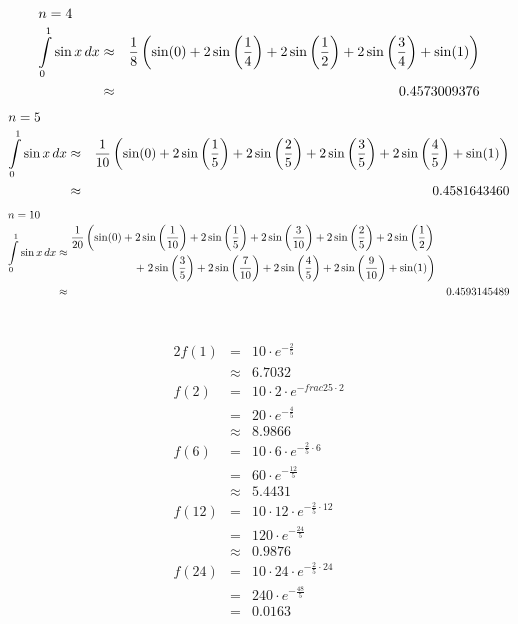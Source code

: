 \documentclass[10pt,a4paper,oneside,ngerman,numbers=noenddot]{scrartcl}
\begin{document}
\section{} %
\begin{alignat*}{2}
\intertext{$n=4$}
\int\limits_{0}^{1} \sin x \,dx &\approx & \frac{1}{8}\left(\sin(0) + 2\sin\left(\frac{1}{4}\right) + 2\sin\left(\frac{1}{2}\right) + 2\sin\left(\frac{3}{4}\right) + \sin(1)\right) \\
&\approx & 0.4573009376
\end{alignat*}
\begin{alignat*}{2}
\intertext{$n=5$}
\int\limits_{0}^{1} \sin x \,dx &\approx & \frac{1}{10}\left(\sin(0) + 2\sin\left(\frac{1}{5}\right) +
2\sin\left(\frac{2}{5}\right) + 2\sin\left(\frac{3}{5}\right) + 2\sin\left(\frac{4}{5}\right) + \sin(1)\right) \\
&\approx & 0.4581643460
\end{alignat*}
\begin{alignat*}{2}
\intertext{$n=10$}
\int\limits_{0}^{1} \sin x \,dx &\approx \begin{split} \frac{1}{20}\left(\sin(0) + 2\sin\left(\frac{1}{10}\right) +
2\sin\left(\frac{1}{5}\right) + 2\sin\left(\frac{3}{10}\right) + 2\sin\left(\frac{2}{5}\right) +
2\sin\left(\frac{1}{2}\right)\right.\\ +
\left. 2\sin\left(\frac{3}{5}\right) + 2\sin\left(\frac{7}{10}\right) + 2\sin\left(\frac{4}{5}\right) +
2\sin\left(\frac{9}{10}\right) + \sin(1)\right)\end{split} \\
&\approx & 0.4593145489
\end{alignat*}
\section{} %
\subsection{} %
\begin{alignat*}{2}
f(1) &=& 10 \cdot e^{-\frac{2}{5}} \\
&\approx & 6.7032 \\
f(2) &=& 10 \cdot 2 \cdot e^{-frac{2}{5}\cdot 2} \\
&=& 20 \cdot e^{-\frac{4}{5}} \\
&\approx & 8.9866 \\
f(6) &=& 10 \cdot 6 \cdot e^{-\frac{2}{5}\cdot 6}\\
&=& 60 \cdot e^{-\frac{12}{5}} \\
&\approx & 5.4431 \\
f(12) &=& 10 \cdot 12 \cdot e^{-\frac{2}{5}\cdot 12} \\
&=& 120 \cdot e^{-\frac{24}{5}} \\
&\approx & 0.9876 \\
f(24) &=& 10 \cdot 24 \cdot e^{-\frac{2}{5}\cdot 24} \\
&=& 240 \cdot e^{-\frac{48}{5}} \\
&=& 0.0163
\end{alignat*}
\end{document}
